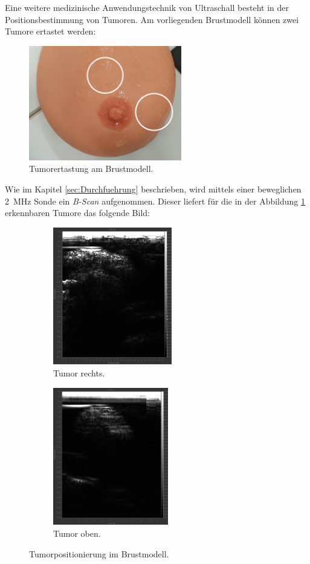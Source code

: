 \noindent Eine weitere medizinische Anwendungstechnik von Ultraschall besteht in der Positionsbestimmung von Tumoren. Am vorliegenden 
Brustmodell können zwei Tumore ertastet werden:

\begin{figure}
    \centering
    \includegraphics[height=5cm]{content/Tumororientierung2.jpg}
    \caption{Tumorertastung am Brustmodell.}
    \label{fig:Brust}
\end{figure}

\noindent Wie im Kapitel \ref{sec:Durchfuehrung} beschrieben, wird mittels einer beweglichen \qty{2}{\mega\hertz} Sonde ein 
\emph{B-Scan} aufgenommen. Dieser liefert für die in der Abbildung \ref{fig:Brust} erkennbaren Tumore das folgende Bild:

\begin{figure}
    \begin{subfigure}{0.48\textwidth}
        \centering
        \includegraphics[height=6cm]{content/Tumor_rechts_2.jpg}
        \caption{Tumor rechts.}
        \label{fig:TR}
    \end{subfigure}
    \hfill
    \begin{subfigure}{0.48\textwidth}
        \centering 
        \includegraphics[height=6cm]{content/Tumor_oben.jpg}
        \caption{Tumor oben.}
        \label{fig:TO}
    \end{subfigure}
    \caption{Tumorpositionierung im Brustmodell.}
    \label{fig:Vergleich}
\end{figure}


